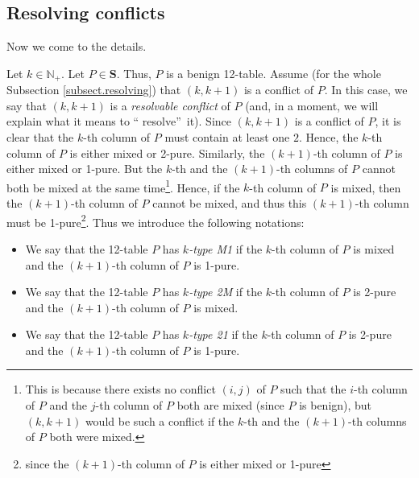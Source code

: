 \documentclass[numbers=enddot,12pt,final,onecolumn,notitlepage]{scrartcl}%
\theoremstyle{definition}
\newenvironment{vershort}{}{}
\begin{document}
\subsection{\label{subsect.resolving}Resolving conflicts}

Now we come to the details.

\begin{vershort}
Let $k\in\mathbb{N}_{+}$. Let $P\in\mathbf{S}$. Thus, $P$ is a benign
12-table. Assume (for the whole Subsection \ref{subsect.resolving}) that
$\left(  k,k+1\right)  $ is a conflict of $P$. In this case, we say that
$\left(  k,k+1\right)  $ is a \textit{resolvable conflict} of $P$ (and, in a
moment, we will explain what it means to \textquotedblleft
resolve\textquotedblright\ it). Since $\left(  k,k+1\right)  $ is a conflict
of $P$, it is clear that the $k$-th column of $P$ must contain at least one
$2$. Hence, the $k$-th column of $P$ is either mixed or 2-pure. Similarly, the
$\left(  k+1\right)  $-th column of $P$ is either mixed or 1-pure. But the
$k$-th and the $\left(  k+1\right)  $-th columns of $P$ cannot both be mixed
at the same time\footnote{This is because there exists no conflict $\left(
i,j\right)  $ of $P$ such that the $i$-th column of $P$ and the $j$-th column
of $P$ both are mixed (since $P$ is benign), but $\left(  k,k+1\right)  $
would be such a conflict if the $k$-th and the $\left(  k+1\right)  $-th
columns of $P$ both were mixed.}. Hence, if the $k$-th column of $P$ is mixed,
then the $\left(  k+1\right)  $-th column of $P$ cannot be mixed, and thus
this $\left(  k+1\right)  $-th column must be 1-pure\footnote{since the
$\left(  k+1\right)  $-th column of $P$ is either mixed or 1-pure}. Thus we
introduce the following notations:

\begin{itemize}
\item We say that the 12-table $P$ has $k$\textit{-type M1} if the $k$-th
column of $P$ is mixed and the $\left(  k+1\right)  $-th column of $P$ is 1-pure.

\item We say that the 12-table $P$ has $k$\textit{-type 2M} if the $k$-th
column of $P$ is 2-pure and the $\left(  k+1\right)  $-th column of $P$ is mixed.

\item We say that the 12-table $P$ has $k$\textit{-type 21} if the $k$-th
column of $P$ is 2-pure and the $\left(  k+1\right)  $-th column of $P$ is 1-pure.
\end{itemize}


\end{vershort}
\end{document}
